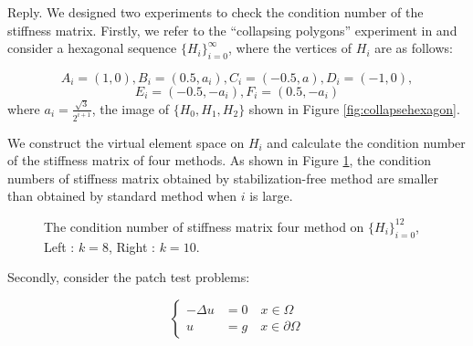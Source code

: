 \documentclass[10pt]{amsart}
\theoremstyle{definition}
\theoremstyle{remark}
\begin{document}
\begin{enumerate}[1.]
\smallskip \noindent \textcolor[rgb]{1.00,0.00,0.00}{Reply.}
We designed two experiments to check the condition number of the stiffness
matrix. Firstly, we refer to the ``collapsing polygons'' experiment in
\cite{Mascotto2018} and consider a hexagonal sequence
$\{H_i\}_{i=0}^{\infty}$, where the vertices of $H_i$ are as follows:

$$
A_i = (1, 0), B_i = (0.5, a_i), C_i = (-0.5, a), D_i=(-1, 0), 
$$
$$
E_i = (-0.5, -a_i), F_i = (0.5, -a_i)
$$
where $a_i = \frac{\sqrt{3}}{2^{i+1}}$, the image of $\{H_0, H_1, H_2\}$ shown
in Figure \ref{fig:collapsehexagon}. 

We construct the virtual element space on $H_i$ and calculate the condition number
of the stiffness matrix of four methods. As shown in Figure
\ref{fig:collapsehexagon_conditionnumber}, the condition numbers of stiffness
matrix obtained by stabilization-free method are smaller than obtained by
standard method when $i$ is large.

\begin{figure}[h]
\centering
{}
\caption{The condition number of stiffness matrix four method on
$\{H_i\}_{i=0}^{12}$, Left : $k = 8$, Right : $k = 10$.}
  \label{fig:collapsehexagon_conditionnumber} %
\end{figure}

Secondly,  consider the patch test problems:

$$
\left\{\begin{aligned}
-\Delta u & = 0 \quad x \in \Omega\\
u & = g \quad x \in \partial \Omega
\end{aligned}\right.
$$


\end{enumerate}
\end{document}
